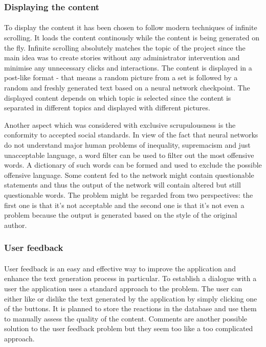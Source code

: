\documentclass[12pt]{report}
\begin{document}
\subsubsection*{Displaying the content}
\paragraph{}
To display the content it has been chosen to follow modern techniques of infinite scrolling. It loads
the content continously while the content is being generated on the fly. Infinite scrolling absolutely matches the 
topic of the project since the main idea was to create stories without any administrator intervention and 
minimise any unnecessary clicks and interactions. The content is displayed in a post-like format - that means 
a random picture from a set is followed by a random and freshly generated text based on a neural network checkpoint.
The displayed content depends on which topic is selected since the content is separated in different topics and 
displayed with different pictures.

Another aspect which was considered with exclusive scrupulousness is the conformity to accepted social standards. 
In view of the fact that neural networks do not understand major human problems of inequality, supremacism and just 
unacceptable language, a word filter can be used to filter out the most offensive words. A dictionary of such words
can be formed and used to exclude the possible offensive language. Some content fed to the network might contain
questionable statements and thus the output of the network will contain altered but still questionable words.
The problem might be regarded from two perspectives: the first one is that it's not acceptable and the second one
is that it's not even a problem because the output is generated based on the style of the original author. 


\subsubsection*{User feedback}
\paragraph{}
User feedback is an easy and effective way to improve the application and enhance the text generation process in
particular. To establish a dialogue with a user the application uses a standard approach to the problem.
The user can either like or dislike the text generated by the application by simply clicking one of the buttons. 
It is planned to store the reactions in the database and use them to manually assess the quality of the content.
Comments are another possible solution to the user feedback problem but they seem too like a too complicated
approach.
\end{document}
